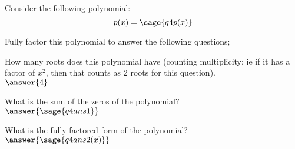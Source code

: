 \documentclass{ximera}
\begin{document}
\begin{problem}
Consider the following polynomial:
\[
p(x) = \sage{q4p(x)}
\]

Fully factor this polynomial to answer the following questions;

How many roots does this polynomial have (counting multiplicity; ie if it has a factor of $x^2$, then that counts as 2 roots for this question). \\
$\answer{4}$

What is the sum of the zeros of the polynomial?\\
$\answer{\sage{q4ans1}}$

What is the fully factored form of the polynomial?\\
$\answer{\sage{q4ans2(x)}}$

\end{problem}
\end{document}
